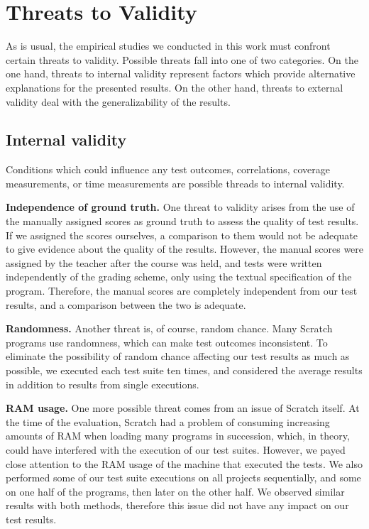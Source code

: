 \section{Threats to Validity}
\label{sec:threats_to_validity}

As is usual, the empirical studies we conducted in this work must confront certain threats to validity.
Possible threats fall into one of two categories.
On the one hand, threats to internal validity represent factors which provide alternative explanations for the presented results.
On the other hand, threats to external validity deal with the generalizability of the results.

\subsection{Internal validity}

Conditions which could influence any test outcomes, correlations, coverage measurements,
or time measurements are possible threads to internal validity.
\parspace

\textbf{Independence of ground truth.}
One threat to validity arises from the use of the manually assigned scores as
ground truth to assess the quality of test results.
If we assigned the scores ourselves,
a comparison to them would not be adequate to give evidence about the quality of the results.
However, the manual scores were assigned by the teacher after the course was held,
and tests were written independently of the grading scheme, only using the textual specification of the program.
Therefore, the manual scores are completely independent from our test results,
and a comparison between the two is adequate.
\parspace

\textbf{Randomness.}
Another threat is, of course, random chance.
Many Scratch programs use randomness, which can make test outcomes inconsistent.
To eliminate the possibility of random chance affecting our test results as much as possible, we executed each test suite ten times,
and considered the average results in addition to results from single executions.
\parspace

\textbf{RAM usage.}
One more possible threat comes from an issue of Scratch itself.
At the time of the evaluation, Scratch had a problem of consuming increasing amounts of RAM when loading many programs in succession,
which, in theory, could have interfered with the execution of our test suites.
However, we payed close attention to the RAM usage of the machine that executed the tests.
We also performed some of our test suite executions on all projects sequentially,
and some on one half of the programs, then later on the other half.
We observed similar results with both methods, therefore this issue did not have any impact on our test results.
\parspace

